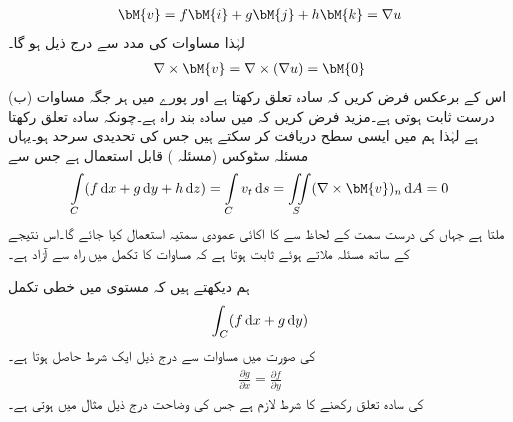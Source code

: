 \begin{align*}
\bM{v}=f\bM{i}+g\bM{j}+h\bM{k}=\nabla  u
\end{align*}
لہٰذا  مساوات  کی مدد سے درج ذیل ہو گا۔
\begin{align*}
\nabla \times \bM{v}=\nabla \times (\nabla u)=\bM{0}
\end{align*}
(ب) اس کے برعکس فرض کریں کہ  سادہ تعلق رکھتا ہے اور  پورے  میں ہر جگہ مساوات  درست ثابت ہوتی ہے۔مزید فرض کریں کہ  میں  سادہ بند راہ ہے۔چونکہ  سادہ تعلق رکھتا ہے لہٰذا ہم  میں ایسی سطح  دریافت کر سکتے ہیں جس کی تحدیدی سرحد  ہو۔یہاں مسئلہ سٹوکس (مسئلہ ) قابل استعمال  ہے جس سے
\begin{align*}
\int\limits_C(f\dif x+g\dif y+h\dif z)=\int\limits_C v_t \dif s=\iint\limits_S (\nabla \times \bM{v})_n \dif A=0
\end{align*}
ملتا ہے جہاں  کی درست سمت کے لحاظ سے  کا اکائی عمودی سمتیہ  استعمال کیا جائے گا۔اس نتیجے کے ساتھ مسئلہ  ملاتے ہوئے ثابت ہوتا ہے کہ  مساوات  کا تکمل  میں راہ سے آزاد ہے۔

ہم دیکھتے ہیں کہ  مستوی میں خطی تکمل
\begin{align*}
\int_C (f\dif x+g\dif y)
\end{align*}
کی صورت میں مساوات  سے درج ذیل ایک شرط حاصل ہوتا ہے۔
\begin{align}\label{مساوات_خطی_تکمل_دو_متغیرات_شرط}
\frac{\partial g}{\partial x}=\frac{\partial f}{\partial y}
\end{align}
 کی سادہ تعلق رکھنے کا شرط  لازم ہے جس کی وضاحت درج ذیل مثال میں ہوتی ہے۔


